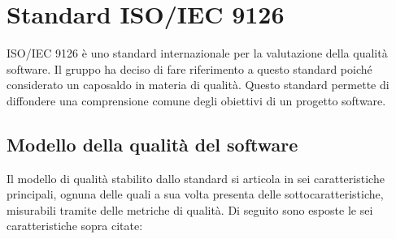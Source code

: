 \section{Standard ISO/IEC 9126} \label{section:ISO_IEC_9126}
ISO/IEC 9126 è uno standard internazionale per la valutazione della qualità software.
Il gruppo \groupName ha deciso di fare riferimento a questo standard poiché considerato un caposaldo in materia di qualità.
Questo standard permette di diffondere una comprensione comune degli obiettivi di un progetto software.

\subsection{Modello della qualità del software} \label{subsection:modello_qualitaSW}
Il modello di qualità stabilito dallo standard si articola in sei caratteristiche principali, ognuna delle quali a sua volta presenta delle sottocaratteristiche, misurabili tramite delle metriche di qualità.
Di seguito sono esposte le sei caratteristiche sopra citate:
